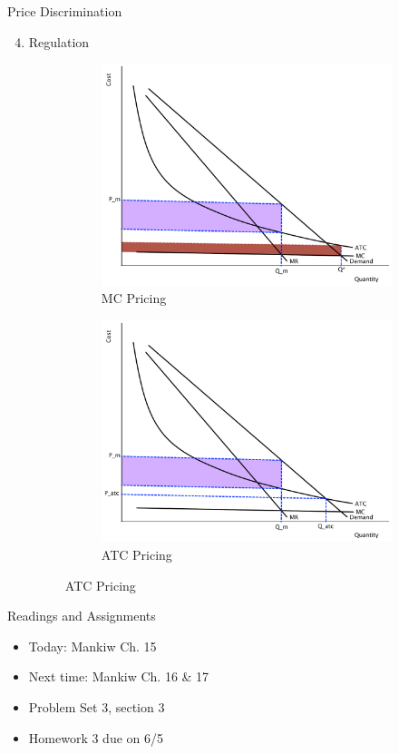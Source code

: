 \documentclass[xcolor={dvipsnames},pdf, hyperref={colorlinks=true, citecolor=ForestGreen, linkcolor=BlueViolet, urlcolor=Magenta}]{beamer}
\begin{document}
\begin{frame}{Price Discrimination}

		\begin{enumerate}
		\setcounter{enumi}{3}
			\item Regulation 
			
			\begin{figure}[H]
				\centering
				\caption{Price Regulation}
				\begin{subfigure}{.4\textwidth}
					\includegraphics[scale=.18]{plot78.pdf}
					\caption{MC Pricing}
				\end{subfigure}%
				\begin{subfigure}{.4\textwidth}
					\centering
					\includegraphics[scale=.18]{plot79.pdf}
					\caption{ATC Pricing}
				\end{subfigure}
			\end{figure}
		
		\end{enumerate}
\end{frame}

\begin{frame}{Readings and Assignments}
\begin{itemize}
	\item Today: Mankiw Ch. 15
	\item Next time: Mankiw Ch. 16 \& 17
	\item Problem Set 3, section 3
	\item Homework 3 due on 6/5
\end{itemize}
\end{frame}
\end{document}
